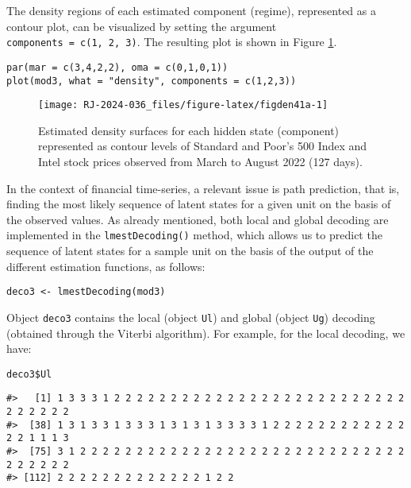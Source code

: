 The density regions of each estimated component (regime), represented as
a contour plot, can be visualized by setting the argument
\texttt{components\ =\ c(1,\ 2,\ 3)}. The resulting plot is shown in Figure
\ref{fig:figden41a}.

\begin{verbatim}
par(mar = c(3,4,2,2), oma = c(0,1,0,1))
plot(mod3, what = "density", components = c(1,2,3))
\end{verbatim}

\begin{figure}

{\centering \texttt{[image: RJ-2024-036\_files/figure-latex/figden41a-1]} 

}

\caption{Estimated density surfaces for each hidden state (component) represented as contour levels of Standard and Poor's 500 Index and Intel stock prices observed from March to August 2022 (127 days).}\label{fig:figden41a}
\end{figure}

In the context of financial time-series, a relevant issue is path
prediction, that is, finding the most likely sequence of latent states
for a given unit on the basis of the observed values. As already
mentioned, both local and global decoding are implemented in the
\texttt{lmestDecoding()} method, which allows us to predict the sequence of
latent states for a sample unit on the basis of the output of the
different estimation functions, as follows:

\begin{verbatim}
deco3 <- lmestDecoding(mod3)
\end{verbatim}

Object \texttt{deco3} contains the local (object \texttt{Ul}) and global (object \texttt{Ug})
decoding (obtained through the Viterbi algorithm). For example, for the
local decoding, we have:

\begin{verbatim}
deco3$Ul
\end{verbatim}

\begin{verbatim}
#>   [1] 1 3 3 3 1 2 2 2 2 2 2 2 2 2 2 2 2 2 2 2 2 2 2 2 2 2 2 2 2 2 2 2 2 2 2 2 2
#>  [38] 1 3 1 3 3 1 3 3 3 1 3 1 3 1 3 3 3 3 1 2 2 2 2 2 2 2 2 2 2 2 2 2 2 1 1 1 3
#>  [75] 3 1 2 2 2 2 2 2 2 2 2 2 2 2 2 2 2 2 2 2 2 2 2 2 2 2 2 2 2 2 2 2 2 2 2 2 2
#> [112] 2 2 2 2 2 2 2 2 2 2 2 2 2 1 2 2
\end{verbatim}

